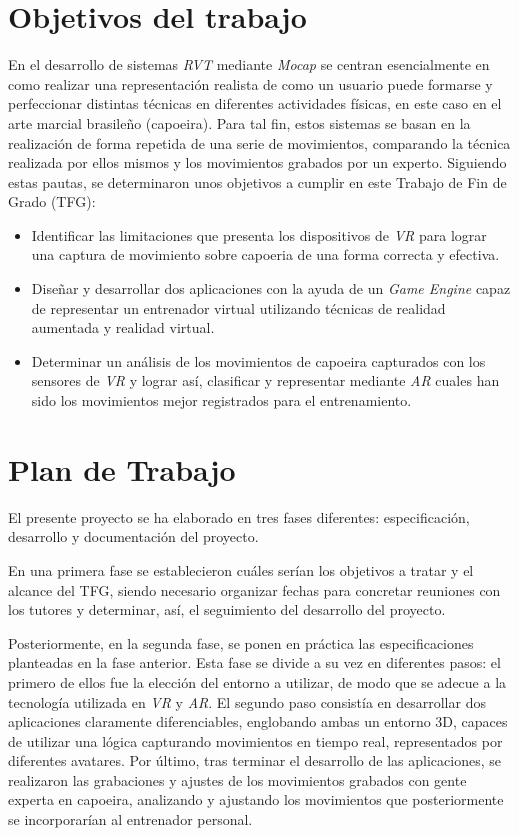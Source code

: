 \section{Objetivos del trabajo}

En el desarrollo de sistemas \textit{RVT} mediante \textit{Mocap} se centran esencialmente en como realizar una representación realista de como un usuario puede formarse y perfeccionar distintas técnicas en diferentes actividades físicas, en este caso en el arte marcial brasileño (capoeira). Para tal fin, estos sistemas se basan en la realización de forma repetida de una serie de movimientos, comparando la técnica realizada por ellos mismos y los movimientos grabados por un experto. Siguiendo estas pautas, se determinaron unos objetivos a cumplir en este Trabajo de Fin de Grado (TFG):

\begin{itemize}
    \item Identificar las limitaciones que presenta los dispositivos de \textit{VR} para lograr una captura de movimiento sobre capoeria de una forma correcta y efectiva.
    \item Diseñar y desarrollar dos aplicaciones con la ayuda de un \textit{Game Engine} capaz de representar un entrenador virtual utilizando técnicas de realidad aumentada y realidad virtual.
    \item Determinar un análisis de los movimientos de capoeira capturados con los sensores de \textit{VR} y lograr así, clasificar y representar mediante \textit{AR} cuales han sido los movimientos mejor registrados para el entrenamiento.
\end{itemize}

\section{Plan de Trabajo}

El presente proyecto se ha elaborado en tres fases diferentes: especificación, desarrollo y documentación del proyecto.

En una primera fase se establecieron cuáles serían los objetivos a tratar y el alcance del TFG, siendo necesario organizar fechas para concretar reuniones con los tutores y determinar, así, el seguimiento del desarrollo del proyecto.

Posteriormente, en la segunda fase, se ponen en práctica las especificaciones planteadas en la fase anterior. Esta fase se divide a su vez en diferentes pasos: el primero de ellos fue la elección del entorno a utilizar, de modo que se adecue a la tecnología utilizada en \textit{VR} y \textit{AR}. El segundo paso consistía en desarrollar dos aplicaciones claramente diferenciables, englobando ambas un entorno 3D, capaces de utilizar una lógica capturando movimientos en tiempo real, representados por diferentes avatares. Por último, tras terminar el desarrollo de las aplicaciones, se realizaron las grabaciones y ajustes de los movimientos grabados con gente experta en capoeira, analizando y ajustando los movimientos que posteriormente se incorporarían al entrenador personal.

